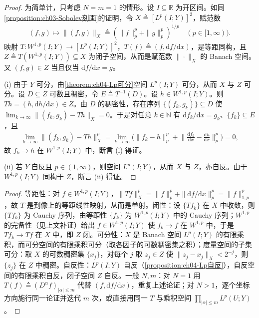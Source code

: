 \documentclass[../../main.tex]{subfiles}%
\begin{document}
\begin{proof}
为简单计，只考虑 $N=m=1$ 的情形。设 $I\subseteq\mathbb{R}$ 为开区间。如同\cref{proposition:ch03-Sobolev刻画}的证明，令 $X\triangleq[L^p(I;Y)]^2$，赋范数
\begin{align*}
(f,g)\mapsto\|(f,g)\|_X\triangleq(\|f\|_p^p+\|g\|_p^p)^{1/p}\quad(p\in[1,\infty)).
\end{align*}
映射 $T:W^{1,p}(I;Y)\to[L^p(I;Y)]^2$，$T(f)\triangleq(f,\mathrm{d}f/\mathrm{d}x)$，是等距同构，且 $Z\triangleq T(W^{1,p}(I;Y))\subseteq X$ 为闭子空间，从而是赋范数 $\|\cdot\|_X$ 的 Banach 空间。又 $(f,g)\in Z$ 当且仅当 $\mathrm{d}f/\mathrm{d}x=g$。

(i) 由于 $Y$ 可分，由\cref{theorem:ch04-Lp可分}空间 $L^p(I;Y)$ 可分，从而 $X$ 与 $Z$ 可分。设 $D\subseteq Z$ 可数且稠密，令 $E\triangleq T^{-1}(D)$。设 $h\in W^{1,p}(I;Y)$。则 $Th=(h,\mathrm{d}h/\mathrm{d}x)\in Z$。由 $D$ 的稠密性，存在序列 $\{(f_k,g_k)\}\subseteq D$ 使 $\lim_{k\to\infty}\|(f_k,g_k)-Th\|_X=0$。于是对任意 $k\in\mathbb{N}$ 有 $\mathrm{d}f_k/\mathrm{d}x=g_k$、$\{f_k\}\subseteq E$，且
\begin{align*}
\lim_{k\to\infty}\|(f_k,g_k)-Th\|_X^p=\lim_{k\to\infty}\Big(\|f_k-h\|_p^p+\Big\|\frac{\mathrm{d}f_k}{\mathrm{d}x}-\frac{\mathrm{d}h}{\mathrm{d}x}\Big\|_p^p\Big)=0,
\end{align*}
故 $f_k\to h$ 在 $W^{1,p}(I;Y)$ 中，断言 (i) 得证。

(ii) 若 $Y$ 自反且 $p\in(1,\infty)$，则空间 $L^p(I;Y)$，从而 $X$ 与 $Z$，亦自反。由于 $W^{1,p}(I;Y)$ 同构于 $Z$，断言 (ii) 得证。
\end{proof}

\begin{proof}
等距性：对 $f\in W^{1,p}(I;Y)$，$\|Tf\|_X^p=\|f\|_p^p+\|\mathrm{d}f/\mathrm{d}x\|_p^p=\|f\|_{1,p}^p$，故 $T$ 是到像上的等距线性映射，从而是单射。闭性：设 $\{Tf_k\}$ 在 $X$ 中收敛，则 $\{Tf_k\}$ 为 Cauchy 序列，由等距性 $\{f_k\}$ 为 $W^{1,p}(I;Y)$ 中的 Cauchy 序列；$W^{1,p}$ 的完备性（见上文补证）给出 $f\in W^{1,p}(I;Y)$ 使 $f_k\to f$ 在 $W^{1,p}$ 中，于是 $Tf_k\to Tf$ 在 $X$ 中，即 $Z$ 闭。可分性：$X$ 是 Banach 空间 $L^p(I;Y)$ 的有限乘积，而可分空间的有限乘积可分（取各因子的可数稠密集之积）；度量空间的子集可分：取 $X$ 的可数稠密集 $\{x_j\}$，对每个 $j$ 取 $z_j\in Z$ 使 $\|z_j-x_j\|_X<2^{-j}$，则 $\{z_j\}$ 在 $Z$ 中稠密。自反性：$L^p(I;Y)$ 自反（\cref{proposition:ch04-Lp自反}），自反空间的有限乘积自反，闭子空间 $Z$ 自反。一般 $N,m$：对 $N=1$ 用 $T(f)\triangleq(D^\alpha f)_{|\alpha|\leqslant m}$ 代替 $(f,\mathrm{d}f/\mathrm{d}x)$，重复上述论证；对 $N>1$，逐个坐标方向施行同一论证并迭代 $m$ 次，或直接用同一 $T$ 与乘积空间 $\prod_{|\alpha|\leqslant m}L^p(U;Y)$。
\end{proof}
\end{document}
